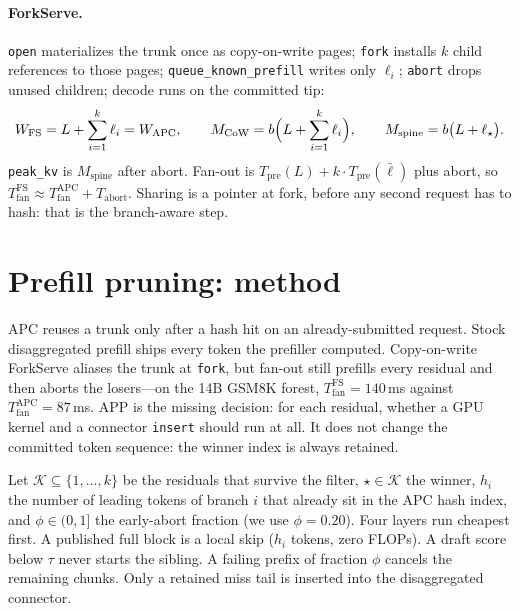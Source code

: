 \documentclass[11pt,a4paper]{article}
\newcommand{\app}{\textsf{APP}\xspace}
\begin{document}
\paragraph{ForkServe.}
\texttt{open} materializes the trunk once as copy-on-write pages; \texttt{fork} installs $k$ child references to those pages; \texttt{queue\_known\_prefill} writes only $\ell_i$; \texttt{abort} drops unused children; decode runs on the committed tip:
\begin{equation}
\label{eq:fs}
W_{\mathrm{FS}}
  =L+\sum_{i=1}^{k}\ell_i
  =W_{\mathrm{APC}},
\qquad
M_{\mathrm{CoW}}
  = b\Bigl(L+\sum_{i=1}^{k}\ell_i\Bigr),
\qquad
M_{\mathrm{spine}}
  = b\bigl(L+\ell_{\star}\bigr).
\end{equation}
\texttt{peak\_kv} is $M_{\mathrm{spine}}$ after abort.
Fan-out is $T_{\mathrm{pre}}(L)+k\cdot T_{\mathrm{pre}}(\bar\ell)$ plus abort, so $T_{\mathrm{fan}}^{\mathrm{FS}}\approx T_{\mathrm{fan}}^{\mathrm{APC}}+T_{\mathrm{abort}}$.
Sharing is a pointer at fork, before any second request has to hash: that is the branch-aware step.

\section{Prefill pruning: method}
\label{sec:app-theory}

APC reuses a trunk only after a hash hit on an already-submitted request.
Stock disaggregated prefill ships every token the prefiller computed.
Copy-on-write ForkServe aliases the trunk at \texttt{fork}, but fan-out still prefills every residual and then aborts the losers---on the 14B GSM8K forest, $T_{\mathrm{fan}}^{\mathrm{FS}}{=}140$\,ms against $T_{\mathrm{fan}}^{\mathrm{APC}}{=}87$\,ms.
\app is the missing decision: for each residual, whether a GPU kernel and a connector \texttt{insert} should run at all.
It does not change the committed token sequence: the winner index is always retained.

Let $\mathcal{K}\subseteq\{1,\ldots,k\}$ be the residuals that survive the filter, $\star\in\mathcal{K}$ the winner, $h_i$ the number of leading tokens of branch $i$ that already sit in the APC hash index, and $\phi\in(0,1]$ the early-abort fraction (we use $\phi{=}0.20$).
Four layers run cheapest first. A published full block is a local skip ($h_i$ tokens, zero FLOPs). A draft score below $\tau$ never starts the sibling. A failing prefix of fraction $\phi$ cancels the remaining chunks. Only a retained miss tail is inserted into the disaggregated connector.
\end{document}
